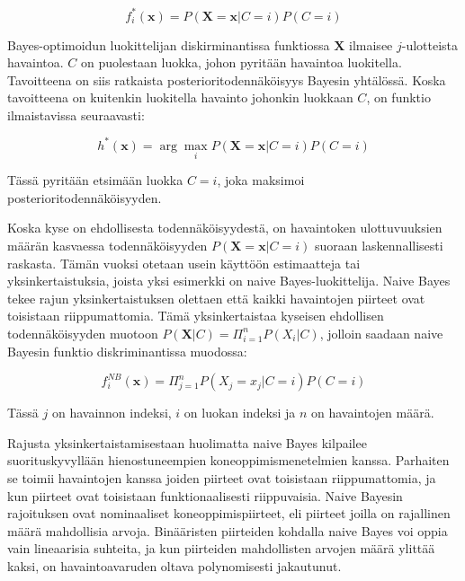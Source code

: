 \documentclass[finnish,twoside,openright]{HYgraduMLDS}
\begin{document}
\begin{equation}
    f^*_i(\textbf{x}) = P(\textbf{X}=\textbf{x} | C=i) P(C=i)
\end{equation}

Bayes-optimoidun luokittelijan diskirminantissa funktiossa $\textbf{X}$ ilmaisee $j$-ulotteista havaintoa. $C$ on puolestaan luokka, johon pyritään havaintoa luokitella. Tavoitteena on siis ratkaista posterioritodennäköisyys Bayesin yhtälössä. Koska tavoitteena on kuitenkin luokitella havainto johonkin luokkaan $C$, on funktio ilmaistavissa seuraavasti\cite{rish2001empirical}:

\begin{equation}
    h^*(\textbf{x}) = \arg \max_i P(\textbf{X} = \textbf{x}|C=i) P(C = i)
\end{equation}

Tässä pyritään etsimään luokka $C = i$, joka maksimoi posterioritodennäköisyyden.

Koska kyse on ehdollisesta todennäköisyydestä, on havaintoken ulottuvuuksien määrän kasvaessa todennäköisyyden $P(\textbf{X} = \textbf{x}|C=i)$ suoraan laskennallisesti raskasta. Tämän vuoksi otetaan usein käyttöön estimaatteja tai yksinkertaistuksia, joista yksi esimerkki on naive Bayes-luokittelija. Naive Bayes tekee rajun yksinkertaistuksen olettaen että kaikki havaintojen piirteet ovat toisistaan riippumattomia. Tämä yksinkertaistaa kyseisen ehdollisen todennäköisyyden muotoon $P(\textbf{X}|C) = \Pi^n_{i=1} P(X_i | C)$, jolloin saadaan naive Bayesin funktio diskriminantissa muodossa:

\begin{equation}
    f^{NB}_i(\textbf{x}) = \Pi^n_{j=1} P(X_j=x_j | C=i) P(C=i)
\end{equation}

Tässä $j$ on havainnon indeksi, $i$ on luokan indeksi ja $n$ on havaintojen määrä. 

Rajusta yksinkertaistamisestaan huolimatta naive Bayes kilpailee suorituskyvyllään hienostuneempien koneoppimismenetelmien kanssa\cite{rish2001empirical}. Parhaiten se toimii havaintojen kanssa joiden piirteet ovat toisistaan riippumattomia, ja kun piirteet ovat toisistaan funktionaalisesti riippuvaisia. Naive Bayesin rajoituksen ovat nominaaliset koneoppimispiirteet, eli piirteet joilla on rajallinen määrä mahdollisia arvoja. Binääristen piirteiden kohdalla naive Bayes voi oppia vain lineaarisia suhteita, ja kun piirteiden mahdollisten arvojen määrä ylittää kaksi, on havaintoavaruden oltava polynomisesti jakautunut\cite{rish2001empirical}.
\end{document}

